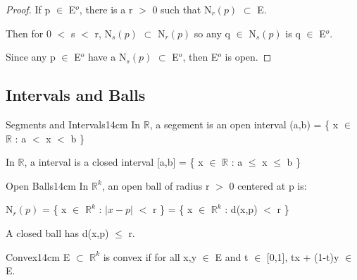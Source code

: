 	\begin{proof}
		If p $\in$ E$^o$, there is a r $>$ 0 such that
		N$_r(p)$ $\subset$ E.

		Then for 0 $<$ s $<$ r, N$_s(p)$ $\subset$ N$_r(p)$
		so any q $\in$ N$_s(p)$ is q $\in$ E$^o$.

		Since any p $\in$ E$^o$ have a N$_s(p)$ $\subset$ E$^o$,
		then E$^o$ is open.
	\end{proof}

	\vspace{0.5cm}





\subsection{ Intervals and Balls } 

	\begin{definition}{Segments and Intervals}{14cm}
		In $\mathbb{R}$, a {\color{lblue} segement} is an open interval
		(a,b) = \{ x $\in$ $\mathbb{R}$ : a $<$ x $<$ b \}

		In $\mathbb{R}$, a {\color{lblue} interval} is a closed interval
		[a,b] = \{ x $\in$ $\mathbb{R}$ : a $\leq$ x $\leq$ b \}
	\end{definition}

	\vspace{0.5cm}



	\begin{definition}{Open Balls}{14cm}
		In $\mathbb{R}^k$, an {\color{lblue} open ball} of radius
		r $>$ 0 centered at p is:

		\qquad N$_r(p)$ = \{ x $\in$ $\mathbb{R}^k$ : $|x-p|$ $<$ r \}
		= \{ x $\in$ $\mathbb{R}^k$ : d(x,p) $<$ r \}

		A {\color{lblue} closed ball} has d(x,p) $\leq$ r.
	\end{definition}
	
	\vspace{0.5cm}



	\begin{definition}{Convex}{14cm}
		E $\subset$ $\mathbb{R}^k$ is {\color{lblue} convex} if for all
		x,y $\in$ E and t $\in$ [0,1], tx + (1-t)y $\in$ E.
	\end{definition}
	
	\vspace{0.5cm}



